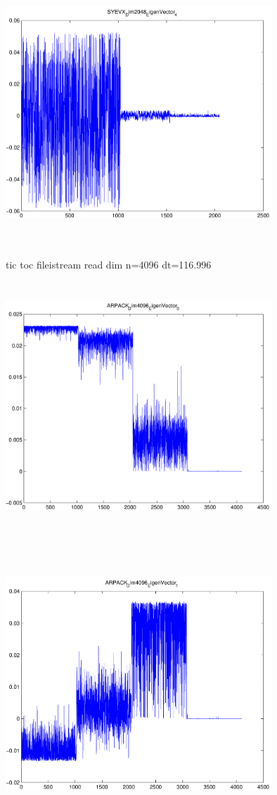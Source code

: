 \documentclass[9pt]{article}
\theoremstyle{plain}
\theoremstyle{definition}
\theoremstyle{remark}
\numberwithin{equation}{section}
\begin{document}
\includegraphics[width=10.0cm,height=10.0cm]{SYEVX_Dim2048_EigenVector_4.pdf}

tic toc fileistream read dim n=4096 dt=116.996
\includegraphics[width=10.0cm,height=10.0cm]{ARPACK_Dim4096_EigenVector_0.pdf}

\includegraphics[width=10.0cm,height=10.0cm]{ARPACK_Dim4096_EigenVector_1.pdf}
\end{document}
